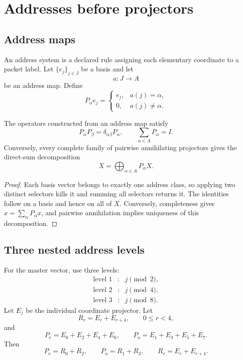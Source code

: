 \chapter{Addresses before projectors}\label{ch:addresses}

\section{Address maps}
An address system is a declared rule assigning each elementary coordinate to a packet label.  Let $\{e_j\}_{j\in J}$ be a basis and let
\[
a:J\longrightarrow A
\]
be an address map.  Define
\[
P_\alpha e_j=
\begin{cases}
e_j,&a(j)=\alpha,\\
0,&a(j)\ne\alpha.
\end{cases}
\]

\begin{theorem}\label{thm:address-projector}
The operators constructed from an address map satisfy
\[
P_\alpha P_\beta=\delta_{\alpha\beta}P_\alpha,
\qquad
\sum_{\alpha\in A}P_\alpha=I.
\]
Conversely, every complete family of pairwise annihilating projectors gives the direct-sum decomposition
\[
X=\bigoplus_{\alpha\in A}P_\alpha X.
\]
\end{theorem}

\begin{proof}
Each basis vector belongs to exactly one address class, so applying two distinct selectors kills it and summing all selectors returns it.  The identities follow on a basis and hence on all of $X$.  Conversely, completeness gives $x=\sum_\alpha P_\alpha x$, and pairwise annihilation implies uniqueness of this decomposition.
\end{proof}

\section{Three nested address levels}
For the master vector, use three levels:
\[
\begin{array}{ccl}
\text{level 1} &:& j\pmod 2,\\
\text{level 2} &:& j\pmod 4,\\
\text{level 3} &:& j\pmod 8.
\end{array}
\]
Let $E_j$ be the individual coordinate projector.  Let
\[
R_r=E_r+E_{r+4},\qquad 0\le r<4,
\]
and
\[
P_{\mathrm e}=E_0+E_2+E_4+E_6,
\qquad
P_{\mathrm o}=E_1+E_3+E_5+E_7.
\]
Then
\[
\boxed{
P_{\mathrm e}=R_0+R_2,
\qquad
P_{\mathrm o}=R_1+R_3,
\qquad
R_r=E_r+E_{r+4}.
}
\]


